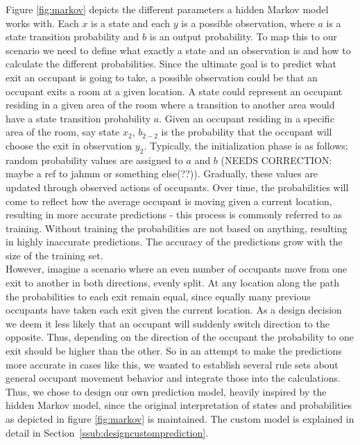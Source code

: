 Figure \ref{fig:markov} depicts the different parameters a hidden Markov model works with. Each \(x\) is a state and each \(y\) is a possible observation, where \(a\) is a state transition probability and \(b\) is an output probability. To map this to our scenario we need to define what exactly a state and an observation is and how to calculate the different probabilities. Since the ultimate goal is to predict what exit an occupant is going to take, a possible observation could be that an occupant exits a room at a given location. A state could represent an occupant residing in a given area of the room where a transition to another area would have a state transition probability \(a\). Given an occupant residing in a specific area of the room, say state \(x_2\), \(b_{2-2}\) is the probability that the occupant will choose the exit in observation \(y_2\). Typically, the initialization phase is as follows; random probability values are assigned to \(a\) and \(b\) (NEEDS CORRECTION: maybe a ref to jahmm or something else(??)). Gradually, these values are updated through observed actions of occupants. Over time, the probabilities will come to reflect how the average occupant is moving given a current location, resulting in more accurate predictions - this process is commonly referred to as training. Without training the probabilities are not based on anything, resulting in highly inaccurate predictions. The accuracy of the predictions grow with the size of the training set. \\
However, imagine a scenario where an even number of occupants move from one exit to another in both directions, evenly split. At any location along the path the probabilities to each exit remain equal, since equally many previous occupants have taken each exit given the current location. As a design decision we deem it less likely that an occupant will suddenly switch direction to the opposite. Thus, depending on the direction of the occupant the probability to one exit should be higher than the other. So in an attempt to make the predictions more accurate in cases like this, we wanted to establish several rule sets about general occupant movement behavior and integrate those into the calculations. Thus, we chose to design our own prediction model, heavily inspired by the hidden Markov model, since the original interpretation of states and probabilities as depicted in figure \ref{fig:markov} is maintained. The custom model is explained in detail in Section~\ref{ssub:designcustomprediction}. 